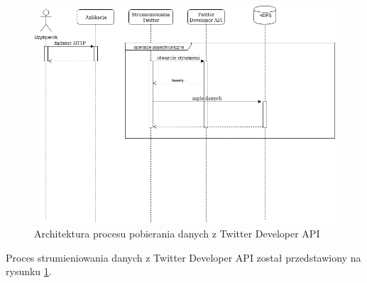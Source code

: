 \begin{figure}
	\centering
	\includegraphics[scale=0.5]{twitter-api-connection.png}
	\caption{Architektura procesu pobierania danych z Twitter Developer API}
	\label{fig:@=twitter-api-connection}
\end{figure}
Proces strumieniowania danych z Twitter Developer API został przedstawiony na rysunku \ref{fig:@=twitter-api-connection}.
